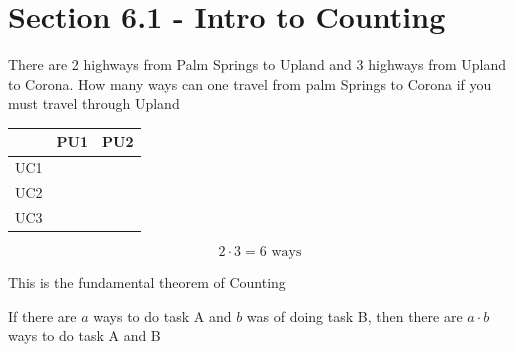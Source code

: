 \documentclass[../../Main.tex]{subfiles}
\begin{document}
\section{Section 6.1 - Intro to Counting}

There are 2 highways from Palm Springs to Upland and 3 highways from Upland to Corona. How many ways can one travel from palm Springs to Corona if you must travel through Upland

\begin{center}
    \begin{tabular}{ c|c|c| } 
        & PU1 & PU2 \\
        \hline
        UC1 & & \\
        \hline 
        UC2 & & \\
        \hline 
        UC3 & & \\ 
        \hline
        \end{tabular}
\end{center}

$$2 \cdot 3 = 6 \text{ ways}$$

This is the fundamental theorem of Counting

\begin{theorem}
    If there are $a$ ways to do task A and $b$ was of doing task B, then there are $a \cdot b$ ways to do task A and B
\end{theorem}
\end{document}
